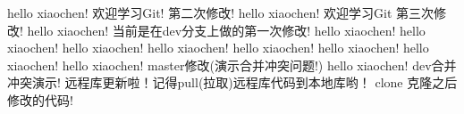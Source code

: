 hello xiaochen! 欢迎学习Git! 第二次修改!
hello xiaochen! 欢迎学习Git  第三次修改!
hello xiaochen!  当前是在dev分支上做的第一次修改!
hello xiaochen!
hello xiaochen!
hello xiaochen!
hello xiaochen!
hello xiaochen!
hello xiaochen!
hello xiaochen!
hello xiaochen!  master修改(演示合并冲突问题!)
hello xiaochen! dev合并冲突演示!
远程库更新啦！记得pull(拉取)远程库代码到本地库哟！
clone 克隆之后修改的代码!
